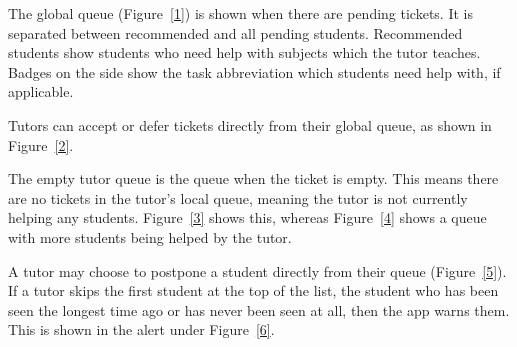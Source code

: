 \documentclass[a4paper,12pt]{article}
\begin{document}
The global queue (Figure~\ref{1}) is shown when there are pending tickets. It is
separated between recommended and all pending students. Recommended
students show students who need help with subjects which the tutor
teaches. Badges on the side show the task abbreviation which students
need help with, if applicable.

Tutors can accept or defer tickets directly from their global queue, as shown
in Figure~\ref{2}.

The empty tutor queue is the queue when the ticket is empty. This means
there are no tickets in the tutor's local queue, meaning the tutor is
not currently helping any students. Figure~\ref{3} shows this, whereas
Figure~\ref{4} shows a queue with more students being helped by the tutor.

A tutor may choose to postpone a student directly from their queue (Figure~\ref{5}).
If a tutor skips the first student at the top of the list, the student
who has been seen the longest time ago or has never been seen at all,
then the app warns them. This is shown in the alert under Figure~\ref{6}.
\end{document}
